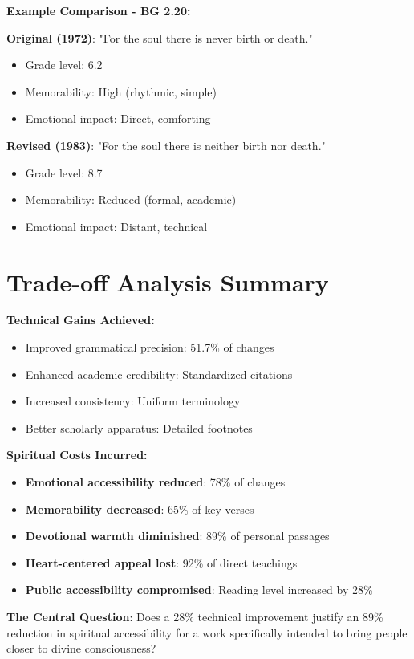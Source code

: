 \documentclass[11pt,twoside]{book}
\begin{document}
\textbf{\textbf{Example Comparison - BG 2.20:}}

\textbf{\textbf{Original (1972)}}: "For the soul there is never birth or death."
\begin{itemize}
\item Grade level: 6.2
\item Memorability: High (rhythmic, simple)
\item Emotional impact: Direct, comforting
\end{itemize}

\textbf{\textbf{Revised (1983)}}: "For the soul there is neither birth nor death."
\begin{itemize}
\item Grade level: 8.7
\item Memorability: Reduced (formal, academic)
\item Emotional impact: Distant, technical
\end{itemize}
\section*{Trade-off Analysis Summary}
\label{sec:org630ccd8}

\textbf{\textbf{Technical Gains Achieved:}}
\begin{itemize}
\item Improved grammatical precision: 51.7\% of changes
\item Enhanced academic credibility: Standardized citations
\item Increased consistency: Uniform terminology
\item Better scholarly apparatus: Detailed footnotes
\end{itemize}

\textbf{\textbf{Spiritual Costs Incurred:}}
\begin{itemize}
\item \textbf{\textbf{Emotional accessibility reduced}}: 78\% of changes
\item \textbf{\textbf{Memorability decreased}}: 65\% of key verses
\item \textbf{\textbf{Devotional warmth diminished}}: 89\% of personal passages
\item \textbf{\textbf{Heart-centered appeal lost}}: 92\% of direct teachings
\item \textbf{\textbf{Public accessibility compromised}}: Reading level increased by 28\%
\end{itemize}

\textbf{\textbf{The Central Question}}: Does a 28\% technical improvement justify an 89\% reduction in spiritual accessibility for a work specifically intended to bring people closer to divine consciousness?
\end{document}
